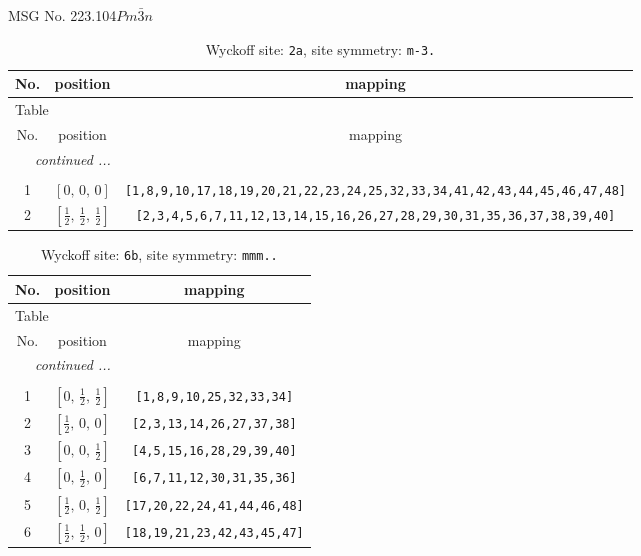 \documentclass[fleqn,8pt]{jsarticle}
\begin{document}
\setcounter{MaxMatrixCols}{32}

\renewcommand{\tablename}{Table~}
\renewcommand{\figurename}{Figure~}
\begin{center}
\LARGE
MSG No. 223.104\quad$Pm\bar{3}n$
\end{center}
\renewcommand{\arraystretch}{1.2}
\begin{longtable}{ccc}
\caption{Wyckoff site: {\tt 2a}, site symmetry: {\tt m-3.}}
 \\
 \hline \hline
No. & position & mapping \\ \hline \endfirsthead

\multicolumn{2}{l}{\tablename\ \thetable{}} \\
 \hline \hline
No. & position & mapping \\ \hline \endhead

 \hline \hline
\multicolumn{2}{r}{\footnotesize\it continued ...} \\ \endfoot

 \hline \hline
\multicolumn{2}{r}{} \\ \endlastfoot

1 & $\left[ 0,\, 0,\, 0 \right]$ & {\tt [1,8,9,10,17,18,19,20,21,22,23,24,25,32,33,34,41,42,43,44,45,46,47,48]} \\ \hline
2 & $\left[ \frac{1}{2},\, \frac{1}{2},\, \frac{1}{2} \right]$ & {\tt [2,3,4,5,6,7,11,12,13,14,15,16,26,27,28,29,30,31,35,36,37,38,39,40]} \\
\end{longtable}
\renewcommand{\arraystretch}{1.2}
\begin{longtable}{ccc}
\caption{Wyckoff site: {\tt 6b}, site symmetry: {\tt mmm..}}
 \\
 \hline \hline
No. & position & mapping \\ \hline \endfirsthead

\multicolumn{2}{l}{\tablename\ \thetable{}} \\
 \hline \hline
No. & position & mapping \\ \hline \endhead

 \hline \hline
\multicolumn{2}{r}{\footnotesize\it continued ...} \\ \endfoot

 \hline \hline
\multicolumn{2}{r}{} \\ \endlastfoot

1 & $\left[ 0,\, \frac{1}{2},\, \frac{1}{2} \right]$ & {\tt [1,8,9,10,25,32,33,34]} \\ \hline
2 & $\left[ \frac{1}{2},\, 0,\, 0 \right]$ & {\tt [2,3,13,14,26,27,37,38]} \\ \hline
3 & $\left[ 0,\, 0,\, \frac{1}{2} \right]$ & {\tt [4,5,15,16,28,29,39,40]} \\ \hline
4 & $\left[ 0,\, \frac{1}{2},\, 0 \right]$ & {\tt [6,7,11,12,30,31,35,36]} \\ \hline
5 & $\left[ \frac{1}{2},\, 0,\, \frac{1}{2} \right]$ & {\tt [17,20,22,24,41,44,46,48]} \\ \hline
6 & $\left[ \frac{1}{2},\, \frac{1}{2},\, 0 \right]$ & {\tt [18,19,21,23,42,43,45,47]} \\
\end{longtable}
\end{document}
